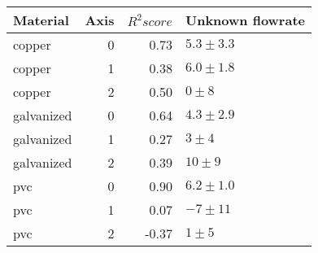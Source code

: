 \begin{tabular}{lrrl}
\toprule
\textbf{Material} & \textbf{Axis} & \textbf{$R^2 score$} & \textbf{Unknown flowrate} \\
\midrule
copper & 0 & 0.73 & $5.3 \pm 3.3$ \\
copper & 1 & 0.38 & $6.0 \pm 1.8$ \\
copper & 2 & 0.50 & $0 \pm 8$ \\
galvanized & 0 & 0.64 & $4.3 \pm 2.9$ \\
galvanized & 1 & 0.27 & $3 \pm 4$ \\
galvanized & 2 & 0.39 & $10 \pm 9$ \\
pvc & 0 & 0.90 & $6.2 \pm 1.0$ \\
pvc & 1 & 0.07 & $-7 \pm 11$ \\
pvc & 2 & -0.37 & $1 \pm 5$ \\
\bottomrule
\end{tabular}
